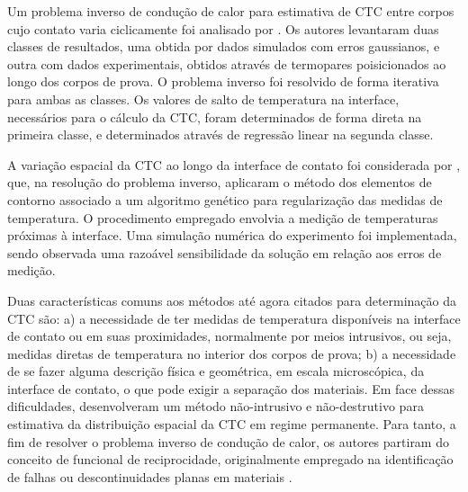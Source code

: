 Um problema inverso de condução de calor para estimativa de CTC entre corpos cujo contato varia ciclicamente foi analisado por \cite{artigo_shoj}.
Os autores levantaram duas classes de resultados, uma obtida por dados simulados com erros gaussianos, e outra com dados experimentais, obtidos através
de termopares poisicionados ao longo dos corpos de prova. O problema
inverso foi resolvido de forma iterativa para ambas as classes. Os valores de salto de temperatura na interface, necessários para o cálculo da CTC,
foram determinados de forma direta na primeira classe, e determinados através de regressão linear na segunda classe. 

A variação espacial da CTC ao longo da interface de contato foi considerada por \cite{artigo_gill}, que, na resolução do problema inverso, aplicaram
o método dos elementos de contorno \citep{livro_bem} associado a um algoritmo genético para regularização das medidas de temperatura. O procedimento empregado
envolvia a medição de temperaturas próximas à interface. Uma simulação numérica do experimento foi implementada, sendo observada uma razoável sensibilidade
da solução em relação aos erros de medição. 

Duas características comuns aos métodos até agora citados para determinação da CTC são: a) a necessidade de ter medidas de temperatura disponíveis na interface de contato ou em suas proximidades,
normalmente por meios intrusivos, ou seja, medidas diretas de temperatura no interior dos corpos de prova; b) a necessidade de se fazer alguma descrição física e geométrica, em
escala microscópica, da interface de contato, o que pode exigir a separação dos materiais. Em face dessas dificuldades, \cite{reciproc_3} desenvolveram
um método não-intrusivo e não-destrutivo para estimativa da distribuição espacial da CTC em regime permanente. Para tanto, a fim de resolver o problema inverso de condução de calor, os autores partiram do conceito de funcional de reciprocidade, originalmente
empregado na identificação de falhas ou descontinuidades planas em materiais \citep{artigo_andrieux}.

